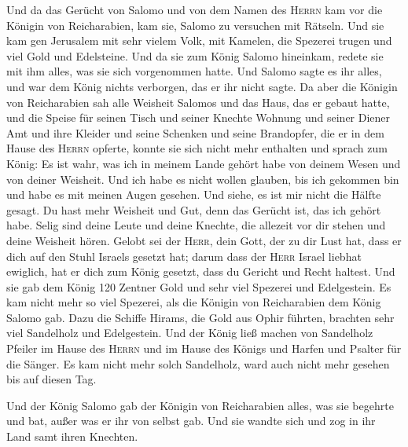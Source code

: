  Und da das Gerücht von Salomo und von dem Namen des
\textsc{Herrn} kam vor die Königin von Reicharabien, kam sie, Salomo zu
versuchen mit Rätseln.  Und sie kam gen Jerusalem mit sehr
vielem Volk, mit Kamelen, die Spezerei trugen und viel Gold und
Edelsteine. Und da sie zum König Salomo hineinkam, redete sie mit ihm
alles, was sie sich vorgenommen hatte.  Und Salomo sagte
es ihr alles, und war dem König nichts verborgen, das er ihr nicht
sagte.  Da aber die Königin von Reicharabien sah alle
Weisheit Salomos und das Haus, das er gebaut hatte,  und
die Speise für seinen Tisch und seiner Knechte Wohnung und seiner Diener
Amt und ihre Kleider und seine Schenken und seine Brandopfer, die er in
dem Hause des \textsc{Herrn} opferte, konnte sie sich nicht mehr
enthalten  und sprach zum König: Es ist wahr, was ich in
meinem Lande gehört habe von deinem Wesen und von deiner Weisheit.
 Und ich habe es nicht wollen glauben, bis ich gekommen
bin und habe es mit meinen Augen gesehen. Und siehe, es ist mir nicht
die Hälfte gesagt. Du hast mehr Weisheit und Gut, denn das Gerücht ist,
das ich gehört habe.  Selig sind deine Leute und deine
Knechte, die allezeit vor dir stehen und deine Weisheit hören.
 Gelobt sei der \textsc{Herr}, dein Gott, der zu dir Lust
hat, dass er dich auf den Stuhl Israels gesetzt hat; darum dass der
\textsc{Herr} Israel liebhat ewiglich, hat er dich zum König gesetzt,
dass du Gericht und Recht haltest.  Und sie gab dem König
120 Zentner Gold und sehr viel Spezerei und Edelgestein. Es kam nicht
mehr so viel Spezerei, als die Königin von Reicharabien dem König Salomo
gab.  Dazu die Schiffe Hirams, die Gold aus Ophir
führten, brachten sehr viel Sandelholz und Edelgestein. 
Und der König ließ machen von Sandelholz Pfeiler im Hause des
\textsc{Herrn} und im Hause des Königs und Harfen und Psalter für die
Sänger. Es kam nicht mehr solch Sandelholz, ward auch nicht mehr gesehen
bis auf diesen Tag.

 Und der König Salomo gab der Königin von Reicharabien
alles, was sie begehrte und bat, außer was er ihr von selbst gab. Und
sie wandte sich und zog in ihr Land samt ihren Knechten.

